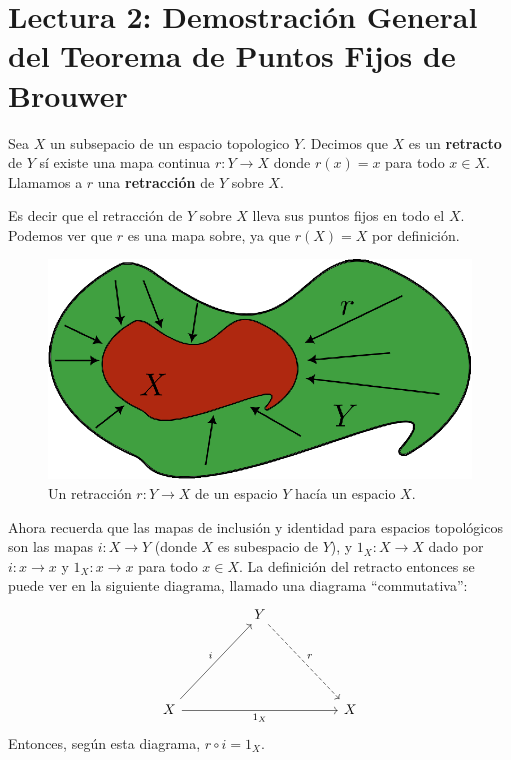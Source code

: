 \section*{Lectura 2: Demostraci\'on General del Teorema de Puntos Fijos de
Brouwer}

\begin{definition}
    Sea $X$ un subsepacio de un espacio topologico  $Y$. Decimos que  $X$ es un
     \textbf{retracto} de $Y$ s\'i existe una mapa continua $r:Y \rightarrow X$
     donde $r(x)=x$ para todo $x \in X$. Llamamos a $r$ una
     \textbf{retracci\'on} de $Y$ sobre  $X$.
\end{definition}

Es decir que el retracci\'on de $Y$ sobre $X$  lleva sus puntos fijos en todo el
$X$. Podemos ver que  $r$ es una mapa sobre, ya que $r(X)=X$ por definici\'on.

\begin{figure}[h]
    \centering
    \includegraphics[scale=1.0]{Figures/retract_diagram.eps}
    \caption{Un retracci\'on $r:Y \rightarrow X$ de un espacio $Y$ hac\'ia un
    espacio  $X$.}
    \label{fig_3}
\end{figure}

Ahora recuerda que las mapas de inclusi\'on y identidad para espacios
topol\'ogicos son las mapas $i:X \rightarrow Y$ (donde $X$ es subespacio de
$Y$), y $1_X:X \rightarrow X$ dado por $i:x \rightarrow x$ y $1_X:x \rightarrow
x$ para todo $x \in X$. La definici\'on del retracto entonces se puede ver en la
siguiente diagrama, llamado una diagrama ``commutativa'':
\[\begin{tikzcd}
	&& Y \\
	\\
	\\
	X &&&& X
	\arrow["i", from=4-1, to=1-3]
	\arrow["{1_X}"', from=4-1, to=4-5]
	\arrow["r", dashed, from=1-3, to=4-5]
\end{tikzcd}\]
Entonces, seg\'un esta diagrama, $r \circ i=1_X$.

